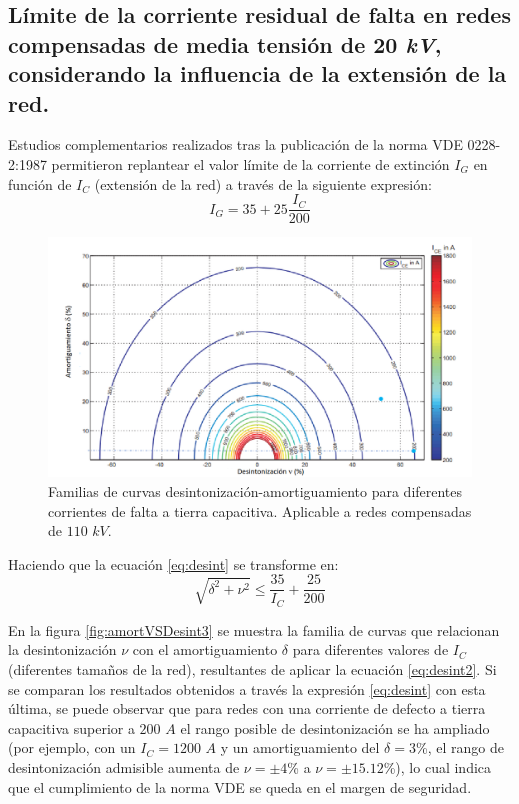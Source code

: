         \subsection{Límite de la corriente residual de falta en redes compensadas de media tensión de 20\textit{ kV}, considerando la influencia de la extensión de la red.}
            Estudios complementarios realizados tras la publicación de la norma VDE 0228-2:1987 permitieron replantear el valor límite de la corriente de extinción $I_\textit{G}$ en función de $I_\textit{C}$ (extensión de la red) a través de la siguiente expresión:
            \begin{equation}\label{eq:IG}
                I_\textit{G} = 35+25\dfrac{I_\textit{C}}{200}
            \end{equation}

            \begin{figure}[H]
                \centering
                \includegraphics[scale=0.3]{capitulos/amortVSDesint2.png}
                \caption{Familias de curvas desintonización-amortiguamiento para diferentes corrientes de falta a tierra capacitiva. Aplicable a redes compensadas de $110\textit{ kV}$.}
                \label{fig:amortVSDesint2}
            \end{figure}
            
            Haciendo que la ecuación \eqref{eq:desint} se transforme en:
            \begin{equation}\label{eq:desint2}
                \sqrt{\delta^2+\nu^2} \leq \dfrac{35}{I_\textit{C}}+\dfrac{25}{200}
            \end{equation}

            En la figura \ref{fig:amortVSDesint3} se muestra la familia de curvas que relacionan la desintonización $\nu$ con el amortiguamiento $\delta$ para diferentes valores de $I_\textit{C}$ (diferentes tamaños de la red), resultantes de aplicar la ecuación \eqref{eq:desint2}. Si se comparan los resultados obtenidos a través la expresión \eqref{eq:desint} con esta última, se puede observar que para redes con una corriente de defecto a tierra capacitiva superior a $200\textit{ A}$ el rango posible de desintonización se ha ampliado (por ejemplo, con un $I_\textit{C} = 1200\textit{ A}$ y un amortiguamiento del $\delta=3\!$\%, el rango de desintonización admisible aumenta de $\nu=\pm 4\!$\% a $\nu = \pm 15.12\!$\%), lo cual indica que el cumplimiento de la norma VDE se queda en el margen de seguridad.

